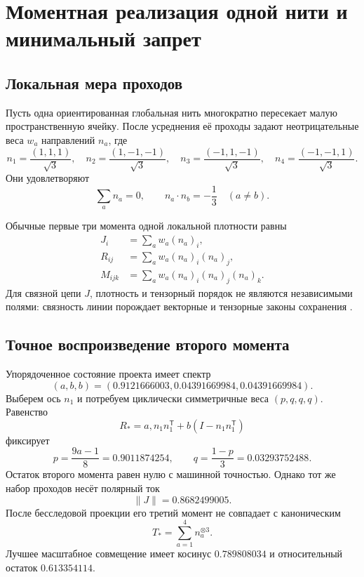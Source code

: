 \chapter{Моментная реализация одной нити и минимальный запрет}
\label{ch:v6-single-thread-moment-realization-gate}

\section{Локальная мера проходов}

Пусть одна ориентированная глобальная нить многократно пересекает малую
пространственную ячейку. После усреднения её проходы задают
неотрицательные веса $w_a$ направлений $n_a$, где
\begin{equation}
 n_1=\frac{(1,1,1)}{\sqrt3},\quad
 n_2=\frac{(1,-1,-1)}{\sqrt3},\quad
 n_3=\frac{(-1,1,-1)}{\sqrt3},\quad
 n_4=\frac{(-1,-1,1)}{\sqrt3}.
\end{equation}
Они удовлетворяют
\begin{equation}
 \sum_a n_a=0,
 \qquad
 n_a\mathbin{\cdot}n_b=-\frac13\quad(a\ne b).
\end{equation}

Обычные первые три момента одной локальной плотности равны
\begin{align}
 J_i&=\sum_a w_a(n_a)_i,\\
 R_{ij}&=\sum_a w_a(n_a)_i(n_a)_j,\\
 M_{ijk}&=\sum_a w_a(n_a)_i(n_a)_j(n_a)_k.
\end{align}
Для связной цепи $J$, плотность и тензорный порядок не являются
независимыми полями: связность линии порождает векторные и тензорные
законы сохранения
\cite{single-thread-moment-svensek2013,single-thread-moment-svensek2016}.

\section{Точное воспроизведение второго момента}

Упорядоченное состояние проекта имеет спектр
\begin{equation}
 (a,b,b)=(0.9121666003,0.04391669984,0.04391669984).
\end{equation}
Выберем ось $n_1$ и потребуем циклически симметричные веса
$(p,q,q,q)$. Равенство
\begin{equation}
 R_*=a,n_1n_1^{\mathsf T}+b(I-n_1n_1^{\mathsf T})
\end{equation}
фиксирует
\begin{equation}
 p=\frac{9a-1}{8}=0.9011874254,
 \qquad
 q=\frac{1-p}{3}=0.03293752488.
\end{equation}
Остаток второго момента равен нулю с машинной точностью. Однако тот же
набор проходов несёт полярный ток
\begin{equation}
 \|J\|=0.8682499005.
\end{equation}
После бесследовой проекции его третий момент не совпадает с каноническим
\begin{equation}
 T_*=\sum_{a=1}^{4}n_a^{\otimes3}.
\end{equation}
Лучшее масштабное совмещение имеет косинус $0.789808034$ и относительный
остаток $0.613354114$.

